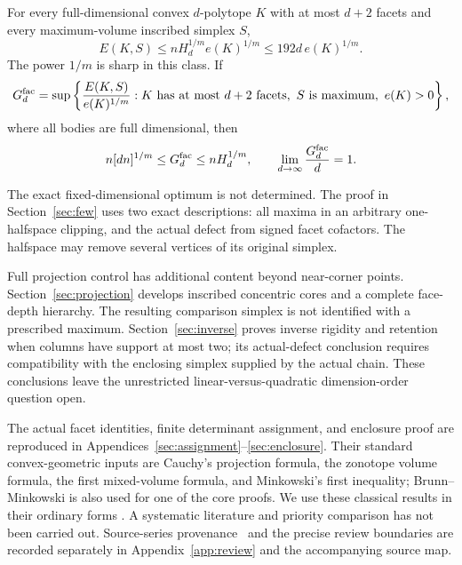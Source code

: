 \begin{theorem}\label{thm:few-facet}
For every full-dimensional convex $d$-polytope $K$ with at most $d+2$
facets and every maximum-volume inscribed simplex $S$,
\begin{equation}\label{eq:few-upper}
 E(K,S)\le nH_d^{1/m}e(K)^{1/m}\le192d\,e(K)^{1/m}.
\end{equation}
The power $1/m$ is sharp in this class. If
\[
 G_d^{\rm fac}=\sup\left\{\frac{E(K,S)}{e(K)^{1/m}}:
 K\text{ has at most }d+2\text{ facets},\ S\text{ is maximum},\ e(K)>0\right\},
\]
where all bodies are full dimensional, then
\begin{equation}\label{eq:few-squeeze}
 n[dn]^{1/m}\le G_d^{\rm fac}\le nH_d^{1/m},
 \qquad\lim_{d\to\infty}\frac{G_d^{\rm fac}}d=1.
\end{equation}
\end{theorem}
The exact fixed-dimensional optimum is not determined. The proof in
Section~\ref{sec:few} uses two exact descriptions: all maxima in an arbitrary
one-halfspace clipping, and the actual defect from signed facet cofactors.
The halfspace may remove several vertices of its original simplex.

Full projection control has additional content beyond near-corner points.
Section~\ref{sec:projection} develops inscribed concentric cores and a
complete face-depth hierarchy. The resulting comparison simplex is not
identified with a prescribed maximum. Section~\ref{sec:inverse} proves
inverse rigidity and retention when columns have support at most two;
its actual-defect conclusion requires compatibility with the enclosing
simplex supplied by the actual chain. These conclusions leave the
unrestricted linear-versus-quadratic dimension-order question open.

The actual facet identities, finite determinant assignment, and enclosure
proof are reproduced in Appendices~\ref{sec:assignment}--\ref{sec:enclosure}.
Their standard convex-geometric inputs are Cauchy's projection formula,
the zonotope volume formula, the first mixed-volume formula, and
Minkowski's first inequality; Brunn--Minkowski is also used for one of the
core proofs. We use these classical results in their ordinary forms
\cite{Schneider}. A systematic literature and priority comparison has not
been carried out. Source-series provenance~\cite{Series} and the precise review
boundaries are recorded separately in Appendix~\ref{app:review} and the
accompanying source map.
